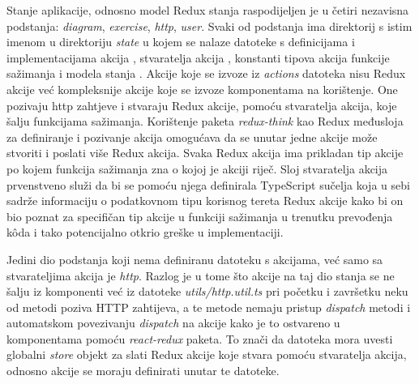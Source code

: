 \documentclass[times, utf8, diplomski, numeric]{fer}
\newcommand{\razmakp}{\vspace{18pt}}
\begin{document}
Stanje aplikacije, odnosno model Redux stanja raspodijeljen je u četiri nezavisna podstanja: \emph{diagram}, \emph{exercise}, \emph{http}, \emph{user}.
Svaki od podstanja ima direktorij s istim imenom u direktoriju \emph{state} u kojem se nalaze datoteke s definicijama i implementacijama akcija , stvaratelja akcija , konstanti tipova akcija  funkcije sažimanja  i modela stanja .
Akcije koje se izvoze iz \emph{actions} datoteka nisu Redux akcije već kompleksnije akcije koje se izvoze komponentama na korištenje.
One pozivaju http zahtjeve i stvaraju Redux akcije, pomoću stvaratelja akcija, koje šalju  funkcijama sažimanja.
Korištenje paketa \emph{redux-think} kao Redux međusloja za definiranje i pozivanje akcija omogućava da se unutar jedne akcije može stvoriti i poslati više Redux akcija.
Svaka Redux akcija ima prikladan tip akcije po kojem funkcija sažimanja zna o kojoj je akciji riječ.
Sloj stvaratelja akcija prvenstveno služi da bi se pomoću njega definirala TypeScript sučelja koja u sebi sadrže informaciju o podatkovnom tipu korisnog tereta  Redux akcije kako bi on bio poznat za specifičan tip akcije u funkciji sažimanja u trenutku prevođenja kôda i tako potencijalno otkrio greške u implementaciji.

Jedini dio podstanja koji nema definiranu datoteku s akcijama, već samo sa stvarateljima akcija je \emph{http}.
Razlog je u tome što akcije na taj dio stanja se ne šalju iz komponenti već iz datoteke \emph{utils/http.util.ts} pri početku i završetku neku od metodi poziva HTTP zahtijeva, a te metode nemaju pristup \emph{dispatch} metodi i automatskom povezivanju \emph{dispatch} na akcije kako je to ostvareno u komponentama pomoću \emph{react-redux} paketa. To znači da datoteka mora uvesti globalni \emph{store} objekt za slati Redux akcije koje stvara pomoću stvaratelja akcija, odnosno akcije se moraju definirati unutar te datoteke.

\razmakp
\end{document}
